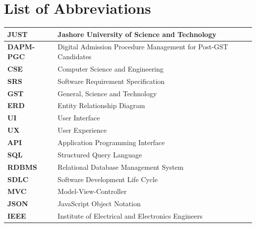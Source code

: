 \newpage
\section*{List of Abbreviations}

\vspace{0.5cm}

\begin{table}[H]
\renewcommand{\arraystretch}{1.5} 
\begin{tabular}{|l|p{10cm}|} 
\hline
\textbf{JUST} & Jashore University of Science and Technology \\ \hline
\textbf{DAPM-PGC} & Digital Admission Procedure Management for Post-GST Candidates \\ \hline
\textbf{CSE} & Computer Science and Engineering \\ \hline
\textbf{SRS} & Software Requirement Specification \\ \hline
\textbf{GST} & General, Science and Technology \\ \hline
\textbf{ERD} & Entity Relationship Diagram \\ \hline
\textbf{UI} & User Interface \\ \hline
\textbf{UX} & User Experience \\ \hline
\textbf{API} & Application Programming Interface \\ \hline
\textbf{SQL} & Structured Query Language \\ \hline
\textbf{RDBMS} & Relational Database Management System \\ \hline
\textbf{SDLC} & Software Development Life Cycle \\ \hline
\textbf{MVC} & Model-View-Controller \\ \hline
\textbf{JSON} & JavaScript Object Notation \\ \hline
\textbf{IEEE} & Institute of Electrical and Electronics Engineers \\ \hline
\end{tabular}
\end{table}